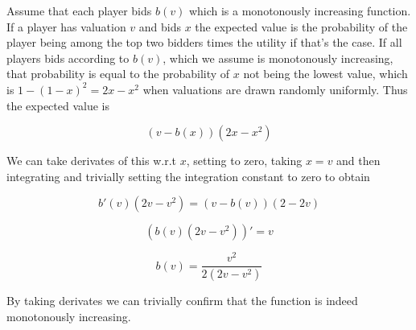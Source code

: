 Assume that each player bids $b(v)$ which is a monotonously increasing function. If a player has valuation $v$ and bids $x$ the expected value is the probability of the player being among the top two bidders times the utility if that's the case. If all players bids according to $b(v)$, which we assume is monotonously increasing, that probability is equal to the probability of $x$ not being the lowest value, which is $1-(1-x)^2 = 2x-x^2$ when valuations are drawn randomly uniformly. Thus the expected value is

$$
(v-b(x))(2x-x^2)
$$

We can take derivates of this w.r.t $x$, setting to zero, taking $x=v$ and then integrating and trivially setting the integration constant to zero to obtain

$$
b'(v)(2v-v^2) = (v-b(v))(2-2v)
$$

$$
(b(v)(2v-v^2))' = v
$$

$$
b(v) = \frac{v^2}{2(2v-v^2)}
$$

By taking derivates we can trivially confirm that the function is indeed monotonously increasing.
